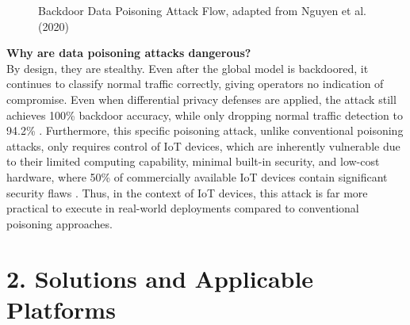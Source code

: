 \documentclass[letterpaper]{article}
\begin{document}
\begin{figure}[h!]
\centering
{}
\caption{Backdoor Data Poisoning Attack Flow, adapted from Nguyen et al. (2020) \cite{nguyen2020}}
\end{figure}

\textbf{Why are data poisoning attacks dangerous?} \\
By design, they are stealthy. Even after the global model is backdoored, it continues to classify normal traffic correctly, giving operators no indication of compromise. Even when differential privacy defenses are applied, the attack still achieves 100\% backdoor accuracy, while only dropping normal traffic detection to 94.2\% \cite{nguyen2020}. Furthermore, this specific poisoning attack, unlike conventional poisoning attacks, only requires control of IoT devices, which are inherently vulnerable due to their limited computing capability, minimal built-in security, and low-cost hardware, where 50\% of commercially available IoT devices contain significant security flaws \cite{sadhu2022}. Thus, in the context of IoT devices, this attack is far more practical to execute in real-world deployments compared to conventional poisoning approaches.
\pagebreak

\section{2. Solutions and Applicable Platforms}
\end{document}
